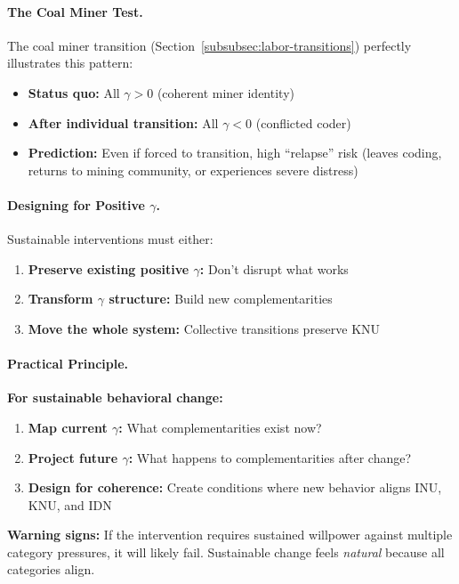 \paragraph{The Coal Miner Test.}
The coal miner transition (Section~\ref{subsubsec:labor-transitions}) 
perfectly illustrates this pattern:

\begin{itemize}
\item \textbf{Status quo:} All $\gamma > 0$ (coherent miner identity)
\item \textbf{After individual transition:} All $\gamma < 0$ (conflicted coder)
\item \textbf{Prediction:} Even if forced to transition, high ``relapse'' risk 
(leaves coding, returns to mining community, or experiences severe distress)
\end{itemize}

\paragraph{Designing for Positive $\gamma$.}
Sustainable interventions must either:

\begin{enumerate}
\item \textbf{Preserve existing positive $\gamma$:} Don't disrupt what works
\item \textbf{Transform $\gamma$ structure:} Build new complementarities
\item \textbf{Move the whole system:} Collective transitions preserve KNU
\end{enumerate}

\paragraph{Practical Principle.}

\begin{tcolorbox}[colback=blue!5!white, colframe=blue!75!black, title=Principle 3: Complementarity Design]
\textbf{For sustainable behavioral change:}
\begin{enumerate}
\item \textbf{Map current $\gamma$:} What complementarities exist now?
\item \textbf{Project future $\gamma$:} What happens to complementarities after change?
\item \textbf{Design for coherence:} Create conditions where new behavior 
aligns INU, KNU, and IDN
\end{enumerate}
\textbf{Warning signs:} If the intervention requires sustained willpower 
against multiple category pressures, it will likely fail. Sustainable 
change feels \emph{natural} because all categories align.
\end{tcolorbox}

